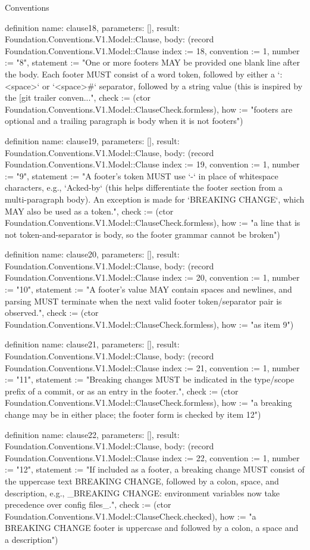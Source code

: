 \begin{lexlean}{Conventions}
\begin{semanticmodule}
definition{
  name: clause18,
  parameters: [],
  result: Foundation.Conventions.V1.Model::Clause,
  body: (record Foundation.Conventions.V1.Model::Clause {index := 18, convention := 1, number := "8", statement := "One or more footers MAY be provided one blank line after the body. Each footer MUST consist of a word token, followed by either a `:<space>` or `<space>#` separator, followed by a string value (this is inspired by the [git trailer conven...", check := (ctor Foundation.Conventions.V1.Model::ClauseCheck.formless), how := "footers are optional and a trailing paragraph is body when it is not footers"})
}

definition{
  name: clause19,
  parameters: [],
  result: Foundation.Conventions.V1.Model::Clause,
  body: (record Foundation.Conventions.V1.Model::Clause {index := 19, convention := 1, number := "9", statement := "A footer's token MUST use `-` in place of whitespace characters, e.g., `Acked-by` (this helps differentiate the footer section from a multi-paragraph body). An exception is made for `BREAKING CHANGE`, which MAY also be used as a token.", check := (ctor Foundation.Conventions.V1.Model::ClauseCheck.formless), how := "a line that is not token-and-separator is body, so the footer grammar cannot be broken"})
}

definition{
  name: clause20,
  parameters: [],
  result: Foundation.Conventions.V1.Model::Clause,
  body: (record Foundation.Conventions.V1.Model::Clause {index := 20, convention := 1, number := "10", statement := "A footer's value MAY contain spaces and newlines, and parsing MUST terminate when the next valid footer token/separator pair is observed.", check := (ctor Foundation.Conventions.V1.Model::ClauseCheck.formless), how := "as item 9"})
}

definition{
  name: clause21,
  parameters: [],
  result: Foundation.Conventions.V1.Model::Clause,
  body: (record Foundation.Conventions.V1.Model::Clause {index := 21, convention := 1, number := "11", statement := "Breaking changes MUST be indicated in the type/scope prefix of a commit, or as an entry in the footer.", check := (ctor Foundation.Conventions.V1.Model::ClauseCheck.formless), how := "a breaking change may be in either place; the footer form is checked by item 12"})
}

definition{
  name: clause22,
  parameters: [],
  result: Foundation.Conventions.V1.Model::Clause,
  body: (record Foundation.Conventions.V1.Model::Clause {index := 22, convention := 1, number := "12", statement := "If included as a footer, a breaking change MUST consist of the uppercase text BREAKING CHANGE, followed by a colon, space, and description, e.g., _BREAKING CHANGE: environment variables now take precedence over config files_.", check := (ctor Foundation.Conventions.V1.Model::ClauseCheck.checked), how := "a BREAKING CHANGE footer is uppercase and followed by a colon, a space and a description"})
}


\end{semanticmodule}
\end{lexlean}
